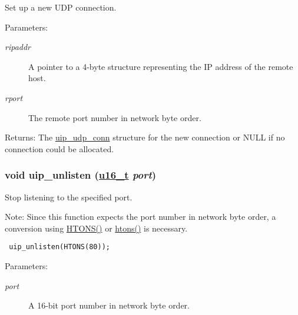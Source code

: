 Set up a new UDP connection. 

\begin{Desc}
\item[Parameters:]
\begin{description}
\item[{\em ripaddr}]A pointer to a 4-byte structure representing the IP address of the remote host.\item[{\em rport}]The remote port number in network byte order.\end{description}
\end{Desc}
\begin{Desc}
\item[Returns:]The \hyperlink{a00032}{uip\_\-udp\_\-conn} structure for the new connection or NULL if no connection could be allocated. \end{Desc}
\hypertarget{a00064_gaa585784b0914cac1d37f07f85457008}{
\subsubsection[uip\_\-unlisten]{\setlength{\rightskip}{0pt plus 5cm}void uip\_\-unlisten (\hyperlink{a00070_gfc6499c1f28697aa3bfc2804d496fd11}{u16\_\-t} {\em port})}}
\label{a00064_gaa585784b0914cac1d37f07f85457008}


Stop listening to the specified port. 

\begin{Desc}
\item[Note:]Since this function expects the port number in network byte order, a conversion using \hyperlink{a00065_g69a7a4951ff21b302267532c21ee78fc}{HTONS()} or \hyperlink{a00065_ga22b04cac8cf283ca12f028578bebc06}{htons()} is necessary.\end{Desc}


\footnotesize\begin{verbatim} uip_unlisten(HTONS(80)); 
\end{verbatim}
\normalsize


\begin{Desc}
\item[Parameters:]
\begin{description}
\item[{\em port}]A 16-bit port number in network byte order. \end{description}
\end{Desc}
